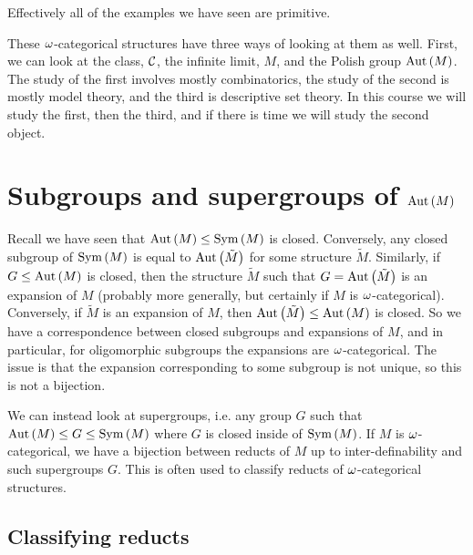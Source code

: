 \documentclass{amsart}
\begin{document}
\begin{rmk}
Effectively all of the examples we have seen are primitive.
\end{rmk}

These $\omega$-categorical structures have three ways of looking at them as well.
First, we can look at the \Fraisse class, $\mathcal{C}$, the infinite \Fraisse limit, $M$,
and the Polish group $\operatorname{Aut}\left( M \right)$.
The study of the first involves mostly combinatorics, 
the study of the second is mostly model theory, and the third is descriptive set theory.
In this course we will study the first, then the third, 
and if there is time we will study the second object.

\section{Subgroups and supergroups of $\operatorname{Aut}\left( M \right)$}

Recall we have seen that $\operatorname{Aut}\left( M \right) \leq \operatorname{Sym}\left( M \right)$ is closed.
Conversely, any closed subgroup of $\operatorname{Sym}\left( M \right)$ is equal to $\operatorname{Aut}\left( \tilde M \right)$
for some structure $\tilde M$.
Similarly, if $G \leq \operatorname{Aut}\left( M \right)$ is closed, 
then the structure $\tilde M$ such that $G = \operatorname{Aut}\left( \tilde M \right)$
is an expansion of $M$ (probably more generally, but certainly if $M$ is $\omega$-categorical).
Conversely, if $\tilde M$ is an expansion of $M$, then 
$\operatorname{Aut}\left( \tilde M \right)\leq \operatorname{Aut}\left( M \right)$ is closed.
So we have a correspondence between closed subgroups and expansions of $M$,
and in particular, for oligomorphic subgroups the expansions are $\omega$-categorical.
The issue is that the expansion corresponding to some subgroup is not unique,
so this is not a bijection.

We can instead look at supergroups,
i.e. any group $G$ such that
$\operatorname{Aut}\left( M \right) \leq G\leq \operatorname{Sym}\left( M \right)$
where $G$ is closed inside of $\operatorname{Sym}\left( M \right)$.
If $M$ is $\omega$-categorical, we have a bijection between 
reducts of $M$ up to inter-definability
and such supergroups $G$.
This is often used to classify reducts of $\omega$-categorical structures.

\subsection{Classifying reducts}
\end{document}
